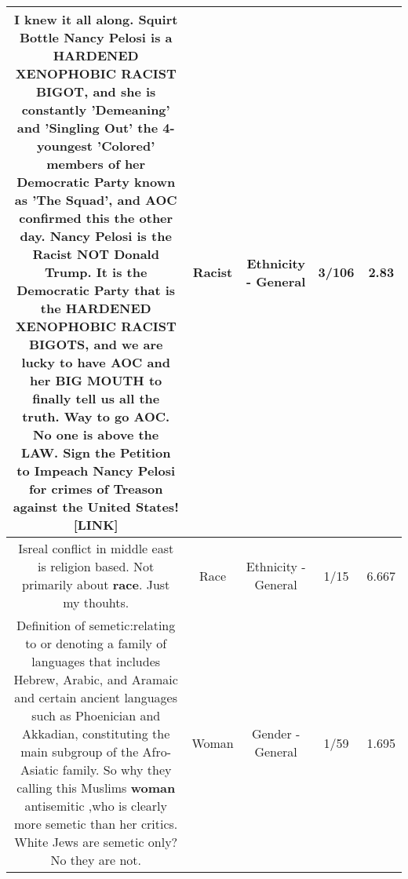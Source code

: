 \documentclass[11pt]{article}
\newlength\mylength
\begin{document}
\begin{center}
\begin{longtable}{|C{.65\mylength}|C{.30\mylength}|C{.12\mylength}|C{.12\mylength}|C{.12\mylength}|}
  \small I knew it all along.   Squirt Bottle Nancy Pelosi is a HARDENED XENOPHOBIC \textbf{RACIST} BIGOT, and she is constantly 'Demeaning' and 'Singling Out' the 4-youngest 'Colored' members of her Democratic Party known as 'The Squad', and AOC confirmed this the other day.  Nancy Pelosi is the \textbf{Racist} NOT Donald Trump.   It is the Democratic Party that is the HARDENED XENOPHOBIC \textbf{RACIST} BIGOTS, and we are lucky to have AOC and her BIG MOUTH to finally tell us all the truth.  Way to go AOC.  No one is above the LAW.   Sign the Petition to Impeach Nancy Pelosi for crimes of Treason against the United States!  [LINK] \normalsize   & Racist & Ethnicity - General & 3/106 & 2.83 \\  \hline
  \small Isreal conflict in middle east is religion based.  Not primarily about \textbf{race}. Just my thouhts.\normalsize   & Race & Ethnicity - General & 1/15 & 6.667 \\  \hline
  \small Definition of semetic:relating to or denoting a family of languages that includes Hebrew, Arabic, and Aramaic and certain ancient languages such as Phoenician and Akkadian, constituting the main subgroup of the Afro-Asiatic family. So why they calling this Muslims  \textbf{woman} antisemitic ,who is clearly more semetic than her critics. White Jews are semetic only? No they are not.\normalsize   & Woman & Gender - General & 1/59 & 1.695 \\  \hline

\end{longtable}
\end{center}
\end{document}

